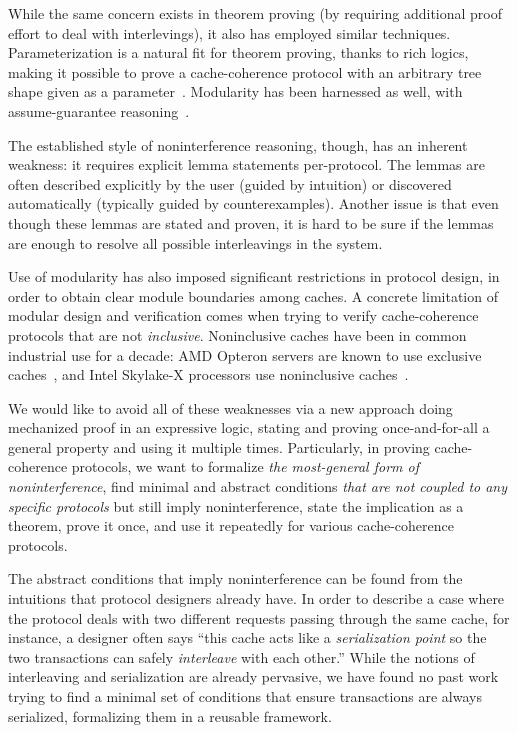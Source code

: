 While the same concern exists in theorem proving (by requiring additional proof effort to deal with interlevings), it also has employed similar techniques.
Parameterization is a natural fit for theorem proving, thanks to rich logics, making it possible to prove a cache-coherence protocol with an arbitrary tree shape given as a parameter~\cite{Murali:2015}.
Modularity has been harnessed as well, \eg{} with assume-guarantee reasoning~\cite{McMillan:2016}.

The established style of noninterference reasoning, though, has an inherent weakness: it requires explicit lemma statements per-protocol.
The lemmas are often described explicitly by the user (guided by intuition) or discovered automatically (typically guided by counterexamples).
Another issue is that even though these lemmas are stated and proven, it is hard to be sure if the lemmas are enough to resolve all possible interleavings in the system.

Use of modularity has also imposed significant restrictions in protocol design, in order to obtain clear module boundaries among caches.
A concrete limitation of modular design and verification comes when trying to verify cache-coherence protocols that are not \emph{inclusive}.
Noninclusive caches have been in common industrial use for a decade: AMD Opteron servers are known to use exclusive caches~\cite{Irazoqui:2016}, and Intel Skylake-X processors use noninclusive caches~\cite{intel-non-inclusive,Zhao:2010,Yan:2019}.

We would like to avoid all of these weaknesses via a new approach doing mechanized proof in an expressive logic, stating and proving once-and-for-all a general property and using it multiple times.
Particularly, in proving cache-coherence protocols, we want to formalize \emph{the most-general form of noninterference}, find minimal and abstract conditions \emph{that are not coupled to any specific protocols} but still imply noninterference, state the implication as a theorem, prove it once, and use it repeatedly for various cache-coherence protocols.

The abstract conditions that imply noninterference can be found from the intuitions that protocol designers already have.
In order to describe a case where the protocol deals with two different requests passing through the same cache, for instance, a designer often says ``this cache acts like a \emph{serialization point} so the two transactions can safely \emph{interleave} with each other.''
While the notions of interleaving and serialization are already pervasive, we have found no past work trying to find a minimal set of conditions that ensure transactions are always serialized, formalizing them in a reusable framework.

